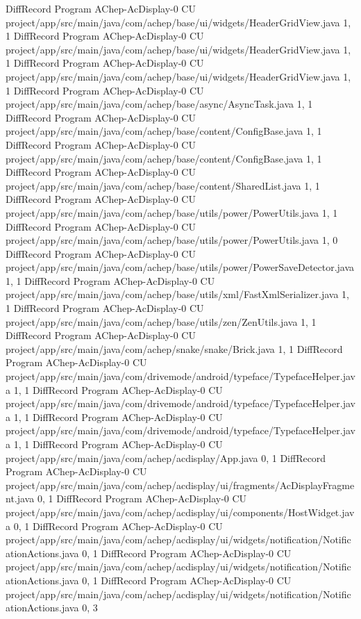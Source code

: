 DiffRecord Program AChep-AcDisplay-0 CU project/app/src/main/java/com/achep/base/ui/widgets/HeaderGridView.java  {1, 1}
DiffRecord Program AChep-AcDisplay-0 CU project/app/src/main/java/com/achep/base/ui/widgets/HeaderGridView.java  {1, 1}
DiffRecord Program AChep-AcDisplay-0 CU project/app/src/main/java/com/achep/base/ui/widgets/HeaderGridView.java  {1, 1}
DiffRecord Program AChep-AcDisplay-0 CU project/app/src/main/java/com/achep/base/async/AsyncTask.java  {1, 1}
DiffRecord Program AChep-AcDisplay-0 CU project/app/src/main/java/com/achep/base/content/ConfigBase.java  {1, 1}
DiffRecord Program AChep-AcDisplay-0 CU project/app/src/main/java/com/achep/base/content/ConfigBase.java  {1, 1}
DiffRecord Program AChep-AcDisplay-0 CU project/app/src/main/java/com/achep/base/content/SharedList.java  {1, 1}
DiffRecord Program AChep-AcDisplay-0 CU project/app/src/main/java/com/achep/base/utils/power/PowerUtils.java  {1, 1}
DiffRecord Program AChep-AcDisplay-0 CU project/app/src/main/java/com/achep/base/utils/power/PowerUtils.java  {1, 0}
DiffRecord Program AChep-AcDisplay-0 CU project/app/src/main/java/com/achep/base/utils/power/PowerSaveDetector.java  {1, 1}
DiffRecord Program AChep-AcDisplay-0 CU project/app/src/main/java/com/achep/base/utils/xml/FastXmlSerializer.java  {1, 1}
DiffRecord Program AChep-AcDisplay-0 CU project/app/src/main/java/com/achep/base/utils/zen/ZenUtils.java  {1, 1}
DiffRecord Program AChep-AcDisplay-0 CU project/app/src/main/java/com/achep/snake/snake/Brick.java  {1, 1}
DiffRecord Program AChep-AcDisplay-0 CU project/app/src/main/java/com/drivemode/android/typeface/TypefaceHelper.java  {1, 1}
DiffRecord Program AChep-AcDisplay-0 CU project/app/src/main/java/com/drivemode/android/typeface/TypefaceHelper.java  {1, 1}
DiffRecord Program AChep-AcDisplay-0 CU project/app/src/main/java/com/drivemode/android/typeface/TypefaceHelper.java  {1, 1}
DiffRecord Program AChep-AcDisplay-0 CU project/app/src/main/java/com/achep/acdisplay/App.java  {0, 1}
DiffRecord Program AChep-AcDisplay-0 CU project/app/src/main/java/com/achep/acdisplay/ui/fragments/AcDisplayFragment.java  {0, 1}
DiffRecord Program AChep-AcDisplay-0 CU project/app/src/main/java/com/achep/acdisplay/ui/components/HostWidget.java  {0, 1}
DiffRecord Program AChep-AcDisplay-0 CU project/app/src/main/java/com/achep/acdisplay/ui/widgets/notification/NotificationActions.java  {0, 1}
DiffRecord Program AChep-AcDisplay-0 CU project/app/src/main/java/com/achep/acdisplay/ui/widgets/notification/NotificationActions.java  {0, 1}
DiffRecord Program AChep-AcDisplay-0 CU project/app/src/main/java/com/achep/acdisplay/ui/widgets/notification/NotificationActions.java  {0, 3}
